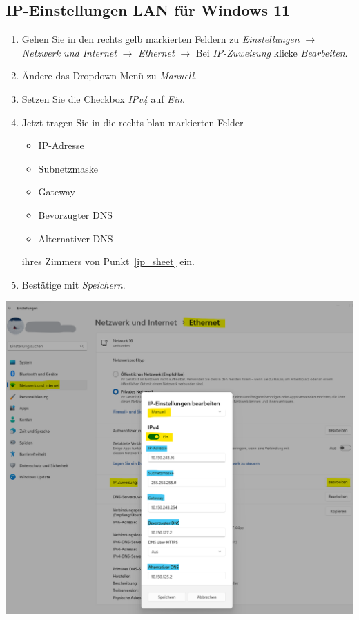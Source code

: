 \documentclass[a4paper,12pt]{scrartcl}
\begin{document}
\subsection{IP-Einstellungen LAN für Windows 11}
\begin{minipage}{0.57\textwidth}
\begin{enumerate}
	\item Gehen Sie in den rechts gelb markierten Feldern zu \textit{Einstellungen} $\rightarrow$ \textit{Netzwerk und Internet} $\rightarrow$ \textit{Ethernet} $\rightarrow$ Bei \textit{IP-Zuweisung} klicke \textit{Bearbeiten}.
	\item Ändere das Dropdown-Menü zu \textit{Manuell}.
	\item Setzen Sie die Checkbox \textit{IPv4} auf \textit{Ein}.
	\item Jetzt tragen Sie in die rechts blau markierten Felder
		\begin{itemize}
			\item IP-Adresse
			\item Subnetzmaske
			\item Gateway
			\item Bevorzugter DNS
			\item Alternativer DNS
		\end{itemize}
	ihres Zimmers von Punkt~\ref{ip_sheet} ein.
	\item Bestätige mit \textit{Speichern}.
\end{enumerate}
\end{minipage}
\hfill
\begin{minipage}{0.4\textwidth}
\includegraphics[width=\linewidth]{Bilder/Win11/ip_win11_de}
\end{minipage}
\end{document}
